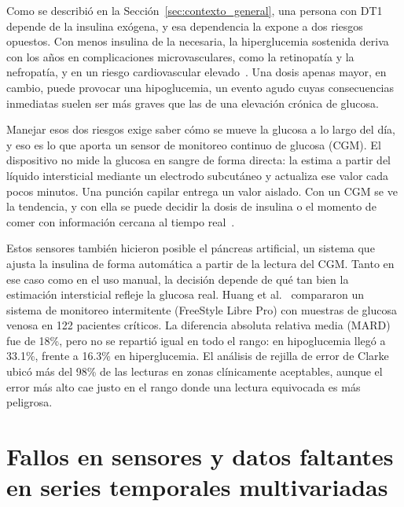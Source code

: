 \documentclass{report}
\begin{document}
Como se describió en la Sección~\ref{sec:contexto_general}, una persona con DT1 depende de la insulina exógena, y esa dependencia la expone a dos riesgos opuestos. Con menos insulina de la necesaria, la hiperglucemia sostenida deriva con los años en complicaciones microvasculares, como la retinopatía y la nefropatía, y en un riesgo cardiovascular elevado~\cite{cobelli2009diabetes}. Una dosis apenas mayor, en cambio, puede provocar una hipoglucemia, un evento agudo cuyas consecuencias inmediatas suelen ser más graves que las de una elevación crónica de glucosa.

Manejar esos dos riesgos exige saber cómo se mueve la glucosa a lo largo del día, y eso es lo que aporta un sensor de monitoreo continuo de glucosa (CGM). El dispositivo no mide la glucosa en sangre de forma directa: la estima a partir del líquido intersticial mediante un electrodo subcutáneo y actualiza ese valor cada pocos minutos. Una punción capilar entrega un valor aislado. Con un CGM se ve la tendencia, y con ella se puede decidir la dosis de insulina o el momento de comer con información cercana al tiempo real~\cite{cobelli2009diabetes}.

Estos sensores también hicieron posible el páncreas artificial, un sistema que ajusta la insulina de forma automática a partir de la lectura del CGM. Tanto en ese caso como en el uso manual, la decisión depende de qué tan bien la estimación intersticial refleje la glucosa real. Huang et al.~\cite{huang2022accuracy} compararon un sistema de monitoreo intermitente (FreeStyle Libre Pro) con muestras de glucosa venosa en 122 pacientes críticos. La diferencia absoluta relativa media (MARD) fue de 18\%, pero no se repartió igual en todo el rango: en hipoglucemia llegó a 33.1\%, frente a 16.3\% en hiperglucemia. El análisis de rejilla de error de Clarke ubicó más del 98\% de las lecturas en zonas clínicamente aceptables, aunque el error más alto cae justo en el rango donde una lectura equivocada es más peligrosa.

\section{Fallos en sensores y datos faltantes en series temporales multivariadas}
\label{sec:fallos_datos_faltantes}
\end{document}

